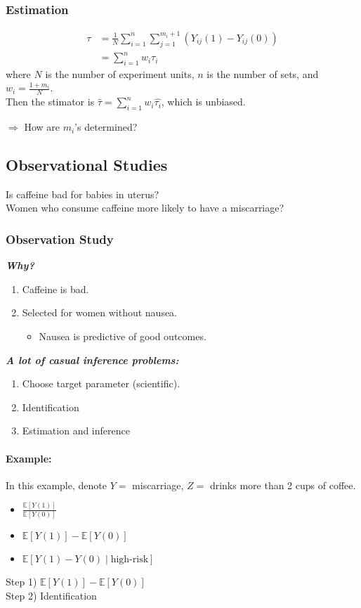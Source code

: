 \subsubsection{Estimation}

\begin{align}
    \tau &= \frac{1}{N} \sum^n_{i=1} \sum^{m_i + 1}_{j=1}(Y_{ij}(1) - Y_{ij}(0))\\
    &= \sum^n_{i=1} w_i\tau_i 
\end{align}
where $N$ is the number of experiment units, $n$ is the number of sets, and $w_i = \frac{1+m_i}{N}$.\\
Then the stimator is $\hat{\tau} = \sum^n_{i=1} w_i\hat{\tau_i}$, which is unbiased.

$\Rightarrow$ How are $m_i$'s determined?

\subsection{Observational Studies}
Is caffeine bad for babies in uterus?\\
Women who consume caffeine more likely to have a miscarriage?
\subsubsection{Observation Study}
\textit{\textbf{Why?}}
\begin{enumerate}
    \item Caffeine is bad.
    \item Selected for women without nausea.
    \begin{itemize}
        \item Nausea is predictive of good outcomes.
    \end{itemize}
\end{enumerate}
\textit{\textbf{A lot of casual inference problems:}}
\begin{enumerate}
    \item Choose target parameter (scientific).
    \item Identification
    \item Estimation and inference
\end{enumerate}

\paragraph{Example:}
In this example, denote $Y=$ miscarriage, $Z =$ drinks more than 2 cups of coffee.
\begin{itemize}
    \item $\frac{\mathbb{E}[Y(1)]}{\mathbb{E}[Y(0)]}$
    \item $\mathbb{E}[Y(1)] - \mathbb{E}[Y(0)]$
    \item $\mathbb{E}[Y(1) - Y(0) \mid \text{high-risk}]$
\end{itemize}
Step 1) $\mathbb{E}[Y(1)] - \mathbb{E}[Y(0)]$\\
Step 2) Identification

